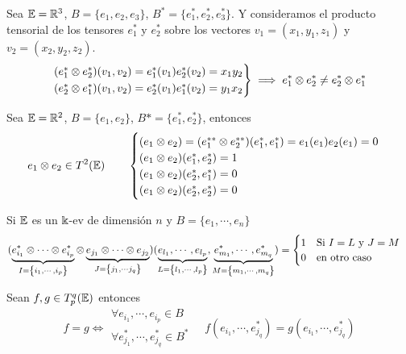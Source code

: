 \begin{example}
    Sea $\mathbb{E} = \mathbb{R}^3$, $B = \{e_1, e_2, e_3\}$, $B^* = \{ e_1^*, e_2^*, e_3^*\}$.
    Y consideramos el producto tensorial de los tensores $e_1^*$ y $e_2^*$ sobre
    los vectores $v_1 = (x_1, y_1, z_1)$ y $v_2 = (x_2,y_2,z_2)$.
    \[
        \begin{rcases}
            (e_1^* \otimes e_2^*)(v_1, v_2) = e_1^*(v_1)e_2^*(v_2) = x_1y_2 \\
            (e_2^* \otimes e_1^*)(v_1, v_2) = e_2^*(v_1)e_1^*(v_2) = y_1x_2
        \end{rcases}
        \implies e_1^* \otimes e_2^* \neq e_2^* \otimes e_1^*
    \]
\end{example}
\begin{example}
    Sea $\mathbb{E} = \mathbb{R}^2$, $B = \{e_1, e_2\}$, $B* = \{e_1^*, e_2^*\}$, entonces
    \[
        e_1 \otimes e_2 \in T^2(\mathbb{E}) \qquad \begin{cases}
            (e_1 \otimes e_2) = (e_1^{**} \otimes e_2^{**})(e_1^*,e_1^*) =
            e_1(e_1)e_2(e_1) = 0 \\
            (e_1 \otimes e_2)(e_1^*,e_2^*) = 1 \\
            (e_1 \otimes e_2)(e_2^*,e_1^*) = 0 \\
            (e_1 \otimes e_2)(e_2^*,e_2^*) = 0
        \end{cases}
    \]
\end{example}
\begin{obs} \label{obs:tens_cero}
    Si $\mathbb{E}$ es un $\Bbbk$-ev de dimensión $n$ y $B = \{e_1, \cdots, e_n\}$
    \[
        (\underbrace{e_{i_1}^* \otimes \cdots \otimes e_{i_p}^*}_
        {I = \left\{i_1, \cdots, i_p\right\}} \otimes
        \underbrace{e_{j_1} \otimes \cdots \otimes e_{j_2}}_
        {J = \left\{j_1, \cdots j_q\right\}})(\underbrace{e_{l_1}, \cdots, e_{l_p}}_
        {L = \left\{l_1, \cdots, l_p\right\}}, \underbrace{e_{m_1}^*, \cdots, e_{m_q}^*}_
        {M = \left\{m_1, \cdots, m_q\right\}}) =
        \begin{cases}
            1 \quad \text{Si } I = L \text{ y } J = M \\
            0 \quad \text{en otro caso}
        \end{cases}
    \]
\end{obs}
\begin{obs}
    Sean $f,g \in T_p^q(\mathbb{E})$ entonces
    \[
        f=g \iff \substack{\forall e_{i_1}, \cdots, e_{i_p} \in B \\ \forall e_{j_1}^*, \cdots,
        e_{j_q}^* \in B^*} \quad f(e_{i_1}, \cdots, e_{j_q}^*) =
        g(e_{i_1}, \cdots, e_{j_q}^*)
    \]
\end{obs}


